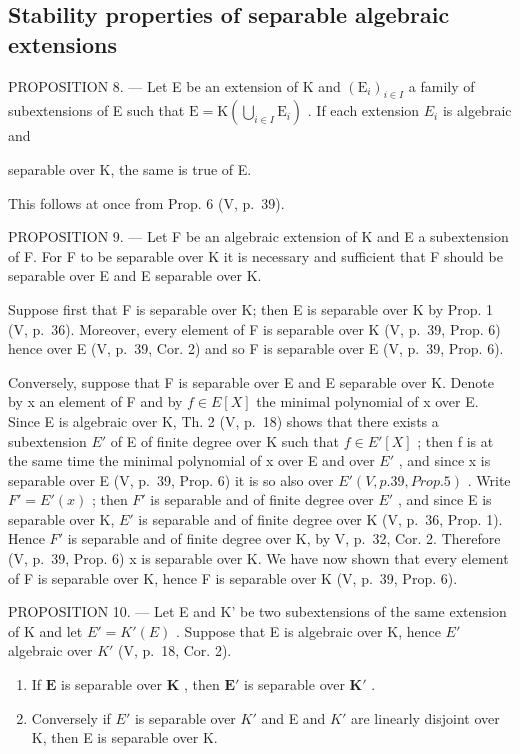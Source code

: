 \subsection{Stability properties of separable algebraic extensions}

PROPOSITION 8. --- Let E be an extension of K and \((\mathrm{E}_{i})_{i\in I}\) a family of subextensions of E such that \(\mathrm{E}=\mathrm{K}\left(\bigcup_{i\in I}\mathrm{E}_{i}\right)\) . If each extension \(E_{i}\) is algebraic and

separable over K, the same is true of E.

This follows at once from Prop. 6 (V, p.~39).

PROPOSITION 9. --- Let F be an algebraic extension of K and E a subextension of F. For F to be separable over K it is necessary and sufficient that F should be separable over E and E separable over K.

Suppose first that F is separable over K; then E is separable over K by Prop. 1 (V, p.~36). Moreover, every element of F is separable over K (V, p.~39, Prop. 6) hence over E (V, p.~39, Cor. 2) and so F is separable over E (V, p.~39, Prop. 6).

Conversely, suppose that F is separable over E and E separable over K. Denote by x an element of F and by \(f \in E[X]\) the minimal polynomial of x over E. Since E is algebraic over K, Th. 2 (V, p.~18) shows that there exists a subextension \(E'\) of E of finite degree over K such that \(f \in E'[X]\) ; then f is at the same time the minimal polynomial of x over E and over \(E'\) , and since x is separable over E (V, p.~39, Prop. 6) it is so also over \(E'(V, p. 39, Prop. 5)\) . Write \(F' = E'(x)\) ; then \(F'\) is separable and of finite degree over \(E'\) , and since E is separable over K, \(E'\) is separable and of finite degree over K (V, p.~36, Prop. 1). Hence \(F'\) is separable and of finite degree over K, by V, p.~32, Cor. 2. Therefore (V, p.~39, Prop. 6) x is separable over K. We have now shown that every element of F is separable over K, hence F is separable over K (V, p.~39, Prop. 6).

PROPOSITION 10. --- Let E and K' be two subextensions of the same extension of K and let \(E' = K'(E)\) . Suppose that E is algebraic over K, hence \(E'\) algebraic over \(K'\) (V, p.~18, Cor. 2).

\begin{enumerate}
\def\labelenumi{\alph{enumi})}
\item
  If \(\mathbf{E}\) is separable over \(\mathbf{K}\) , then \(\mathbf{E}'\) is separable over \(\mathbf{K}'\) .
\item
  Conversely if \(E'\) is separable over \(K'\) and E and \(K'\) are linearly disjoint over K, then E is separable over K.
\end{enumerate}

